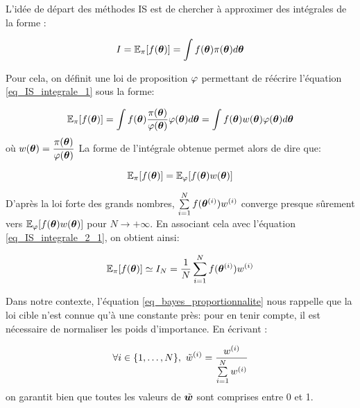  L'idée de départ des méthodes IS est de chercher à approximer des intégrales de la forme : 
 
 \begin{equation}
  I = \mathbb{E}_\pi[f({\bm{\theta}})] = \int f({\bm{\theta}})\pi({\bm{\theta}})d{\bm{\theta}}
  \label{eq_IS_integrale_1}
 \end{equation}
 
 Pour cela, on définit une loi de proposition ${\varphi}$ permettant de réécrire l'équation \eqref{eq_IS_integrale_1} sous la forme:
 
 \begin{equation}
\mathbb{E}_\pi[f({\bm{\theta}})] = \int  f({\bm{\theta}}) \dfrac{\pi({\bm{\theta}})}{{\varphi}({\bm{\theta}})}{\varphi}({\bm{\theta}})d{\bm{\theta}} = \int  f({\bm{\theta}}) w({\bm{\theta}}) {\varphi}({\bm{\theta}})d{\bm{\theta}} 
\label{eq_IS_integrale_2}
 \end{equation}
 où $w({\bm{\theta}}) = \dfrac{\pi({\bm{\theta}})}{{\varphi}({\bm{\theta}})}$  La forme de l'intégrale obtenue permet alors de dire que:
 
\begin{equation}
\mathbb{E}_\pi[f({\bm{\theta}})] = \mathbb{E}_{\varphi}[f({\bm{\theta}})w({\bm{\theta}})] 
\label{eq_IS_integrale_2_1}
\end{equation}

D'après la loi forte des grands nombres,  $\sum\limits_{i=1}^N f({\bm{\theta}}^{(i)}) w^{(i)}$ converge presque sûrement vers  $\mathbb{E}_\varphi[f({\bm{\theta}})w({\bm{\theta}})]$ pour $N \rightarrow + \infty$. En associant cela avec l'équation \eqref{eq_IS_integrale_2_1}, on obtient ainsi:
 
 \begin{equation}
 \mathbb{E}_\pi[f({\bm{\theta}})] \simeq I_N = \dfrac{1}{N}\sum\limits_{i=1}^N f({\bm{\theta}}^{(i)})  w^{(i)}
 \label{eq_IS_integrale_3}
 \end{equation}
 
 Dans notre contexte, l'équation \eqref{eq_bayes_proportionnalite} nous rappelle que la loi cible n'est connue qu'à une constante près: pour en tenir compte, il est nécessaire de normaliser les poids d'importance. En écrivant : 
 
 \begin{equation}
 \forall i \in \{1, \dots, N\}, ~ {\tilde{w}}^{(i)} = \dfrac{w^{(i)}}{\sum\limits_{i=1}^N w^{(i)}}
 \label{eq_IS_poids_normalises}
 \end{equation}
 on garantit bien que toutes les valeurs de ${\tilde{\bm{w}}}$ sont comprises entre 0 et 1. \\
 
